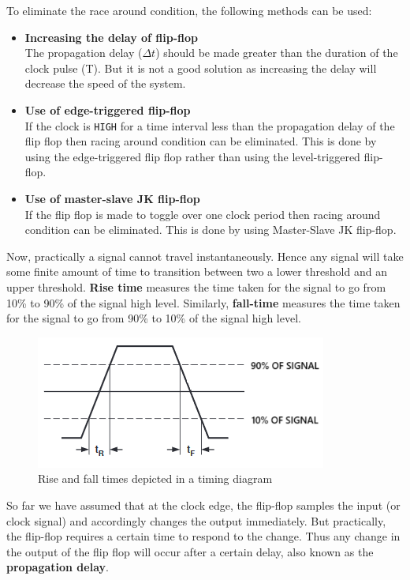 To eliminate the race around condition, the following methods can be used:

\begin{itemize}[itemsep=5pt]
    \item \textbf{Increasing the delay of flip-flop}\\
    The propagation delay ($\Delta t$) should be made greater than the duration of the clock pulse (T). But it is not a good solution as increasing the delay will decrease the speed of the system.
    \item \textbf{Use of edge-triggered flip-flop}\\
    If the clock is \verb|HIGH| for a time interval less than the propagation delay of the flip flop then racing around condition can be eliminated. This is done by using the edge-triggered flip flop rather than using the level-triggered flip-flop.
    \item \textbf{Use of master-slave JK flip-flop}\\
    If the flip flop is made to toggle over one clock period then racing around condition can be eliminated. This is done by using Master-Slave JK flip-flop.
\end{itemize}

Now, practically a signal cannot travel instantaneously. Hence any signal will take some finite amount of time to transition between two a lower threshold and an upper threshold. \textbf{Rise time} measures the time taken for the signal to go from 10\% to 90\% of the signal high level. Similarly, \textbf{fall-time} measures the time taken for the signal to go from 90\% to 10\% of the signal high level.

\begin{figure}[H]
    \centering
    \includegraphics[width=0.75\columnwidth]{images/risediag.png}
    \caption{Rise and fall times depicted in a timing diagram}
\end{figure}

So far we have assumed that at the clock edge, the flip-flop samples the input (or clock signal) and accordingly changes the output immediately. But practically, the flip-flop requires a certain time to respond to the change. Thus any change in the output of the flip flop will occur after a certain delay, also known as the \textbf{propagation delay}.

